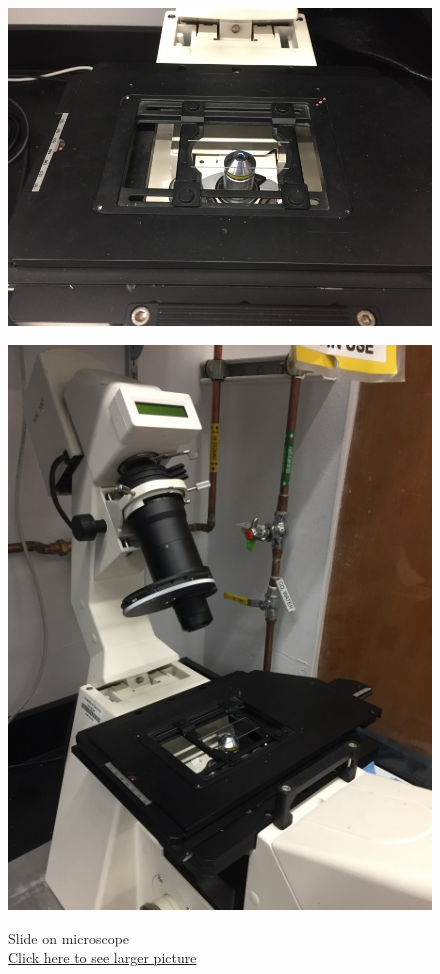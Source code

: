 \documentclass{../lab}
\begin{document}
\begin{figure}[H]
  \href{http://experimentationlab.berkeley.edu/sites/default/files/upimages/Slide-on-Microscope_2544.JPG}{\includegraphics[width=\linewidth,keepaspectratio]{images/Slide-on-Microscope_2544.JPG}}
  \caption{Slide on microscope\\ \href{http://experimentationlab.berkeley.edu/sites/default/files/upimages/Slide-on-Microscope_2544.JPG}{Click here to see larger picture}}
  \label{fig:MicroscopeSlide}
\endminipage\hfill
{}
  \href{http://experimentationlab.berkeley.edu/sites/default/files/upimages/1_Tilt-Microscope_2542.JPG}{\includegraphics[width=\linewidth,keepaspectratio]{images/1_Tilt-Microscope_2542.JPG}}

\end{figure}
\end{document}
